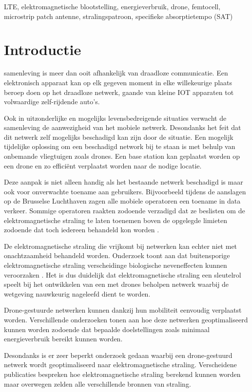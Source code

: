 \documentclass[twocolumn]{phdsymp_dutch}
\begin{document}
\begin{keywords}
LTE, elektromagnetische blootstelling, energieverbruik, drone, femtocell, microstrip patch antenne, stralingspatroon, specifieke absorptietempo (SAT)
\end{keywords}

\section{Introductie}
 samenleving is meer dan ooit afhankelijk van draadloze communicatie.
Een elektronisch apparaat kan op elk gegeven moment in elke willekeurige plaats beroep doen 
op het draadloze netwerk, gaande van kleine \gls{IOT} apparaten tot volwaardige zelf-rijdende auto's.

Ook in uitzonderlijke en mogelijks levensbedreigende situaties verwacht de samenleving de aanwezigheid 
van het mobiele netwerk. Desondanks het feit dat dit netwerk zelf mogelijks beschadigd kan zijn door de situatie.
Een mogelijk tijdelijke oplossing om een beschadigd network bij te staan is met behulp van onbemande vliegtuigen zoals drones.
Een base station kan geplaatst worden op een drone en zo effici\"ent verplaatst worden naar de nodige locatie.

Deze aanpak is niet alleen handig als het bestaande netwerk beschadigd is maar ook voor onverwachte toename aan gebruikers.
Bijvoorbeeld tijdens de aanslagen op de Brusselse Luchthaven zagen alle mobiele operatoren een toename in data verkeer.
Sommige operatoren raakten zodoende verzadigd dat ze beslisten om de
elektromagnetische straling te laten toenemen boven de opgelegde limieten zodoende dat toch iedereen behandeld kon worden \cite{baseZaventem}.

De elektromagnetische straling die vrijkomt bij netwerken kan echter niet met onachtzaamheid behandeld worden.
Onderzoek toont aan dat buitensporige elektromagnetische straling verscheidinge biologische neveneffecten kunnen veroorzaken \cite{J31_bioeffects,WHO}.
Het is dus duidelijk dat elektromagnetische straling een sleutelrol speelt bij het ontwikkelen van een met drones beholpen netwerk 
waarbij de wetgeving nauwkeurig nageleefd dient te worden.

Drone-gestuurde netwerken kunnen dankzij hun mobiliteit eenvoudig verplaatst worden. Verschillende onderzoeken 
tonen aan hoe deze netwerken geoptimaliseerd kunnen worden zodoende dat bepaalde doelstellingen zoals minimaal energieverbruik
bereikt kunnen worden.

Desondanks is er zeer beperkt onderzoek gedaan waarbij een drone-gestuurd netwerk wordt geoptimaliseerd naar elektromagnetische straling.
Verscheidene publicaties bespreken hoe elektromagnetische straling berekend kunnen worden maar 
overwegen zelden alle verschillende bronnen van straling.
\end{document}
